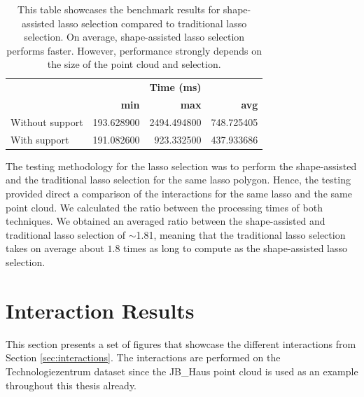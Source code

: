 \begin{table}
\centering
\begin{tabular}{ l | r | r | r }
                   & \multicolumn{3}{c}{\textbf{Time (ms)}}\\
                   & \textbf{min}    & \textbf{max}    & \textbf{avg} \\
        \hline
Without support    & 193.628900 & 2494.494800 & 748.725405 \\
With support       & 191.082600 & 923.332500 & 437.933686 \\

\end{tabular}
\caption{This table showcases the benchmark results for shape-assisted lasso selection compared to traditional lasso selection. On average, shape-assisted lasso selection performs faster. However, performance strongly depends on the size of the point cloud and selection. }
\label{tab:lasso_performance}
\end{table}

The testing methodology for the lasso selection was to perform the shape-assisted and the traditional lasso selection for the same lasso polygon. Hence, the testing provided direct a comparison of the interactions for the same lasso and the same point cloud. We calculated the ratio between the processing times of both techniques. We obtained an averaged ratio between the shape-assisted and traditional lasso selection of $\sim$1.81, meaning that the traditional lasso selection takes on average about $1.8$ times as long to compute as the shape-assisted lasso selection. 


\section{Interaction Results}
\label{sec:interaction_results}

This section presents a set of figures that showcase the different interactions from Section \ref{sec:interactions}. The interactions are performed on the Technologiezentrum dataset since the JB\_Haus point cloud is used as an example throughout this thesis already. 

